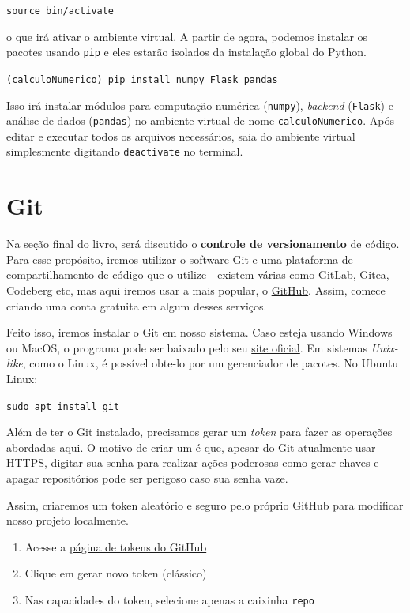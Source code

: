 \documentclass{article}
\begin{document}
	\vspace{1ex}
	\texttt{source bin/activate}
	\vspace{1ex} 

	o que irá ativar o ambiente virtual. A partir de agora, podemos instalar os pacotes usando \texttt{pip} e eles estarão
	isolados da instalação global do Python. 

	\vspace{1ex} 
	\texttt{(calculoNumerico) pip install numpy Flask pandas} 
	\vspace{1ex} 

	Isso irá instalar módulos para computação numérica (\texttt{numpy}), \textit{backend} (\texttt{Flask}) e
	análise de dados (\texttt{pandas}) no ambiente virtual de nome \texttt{calculoNumerico}. Após editar e executar todos
	os arquivos necessários, saia do ambiente virtual simplesmente digitando \texttt{deactivate} no terminal. 

	\section{Git} 

	Na seção final do livro, será discutido o \textbf{controle de versionamento} de código. Para esse propósito, iremos utilizar 
	o software Git e uma plataforma de compartilhamento de código que o utilize - existem várias como GitLab, Gitea, Codeberg etc, mas
	aqui iremos usar a mais popular, o \href{https://github.com/}{GitHub}. Assim, comece criando uma conta gratuita em algum desses serviços.

	Feito isso, iremos instalar o Git em nosso sistema. Caso esteja usando Windows ou MacOS, o programa pode ser baixado 
	pelo seu \href{https://git-scm.com/}{site oficial}. Em sistemas \textit{Unix-like}, como o Linux, é possível obte-lo por um 
	gerenciador de pacotes. No Ubuntu Linux: 

	\vspace{1ex}
	\texttt{sudo apt install git}
	\vspace{1ex}

	Além de ter o Git instalado, precisamos gerar um \textit{token} para fazer as operações abordadas aqui. 
	O motivo de criar um é que, apesar do Git atualmente \href{https://www.cloudflare.com/pt-br/learning/ssl/what-is-https/}{usar HTTPS}, digitar
	sua senha para realizar ações poderosas como gerar chaves e apagar repositórios pode ser perigoso caso sua senha vaze. 

	Assim, criaremos um token aleatório e seguro pelo próprio GitHub para modificar nosso projeto localmente. 
	\begin{enumerate}
		\item{Acesse a \href{https://github.com/settings/tokens}{página de tokens do GitHub}}
		\item{Clique em gerar novo token (clássico)}
		\item{Nas capacidades do token, selecione apenas a caixinha \texttt{repo}}
	\end{enumerate}
\end{document}
